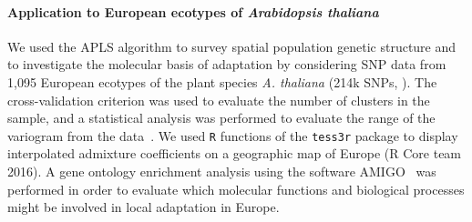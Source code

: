 \paragraph{Application to European ecotypes of {\it Arabidopsis  thaliana}} We used  the APLS algorithm to survey spatial population genetic structure and to investigate the molecular basis of adaptation  by considering SNP data from 1,095  European ecotypes of the plant species {\it A. thaliana} (214k SNPs, \cite{Horton2012}). The cross-validation criterion was used to evaluate the number of clusters in the sample, and a statistical analysis was performed to evaluate the range of the variogram from the data~\citep{Cressie1993}. We used {\tt R} functions of the {\tt tess3r} package to display interpolated admixture coefficients on a geographic map of Europe (R Core team 2016). A gene ontology enrichment analysis using the software AMIGO~\citep{Carbon2009} was performed in order to evaluate which molecular functions and biological processes might be involved in local adaptation in Europe.







